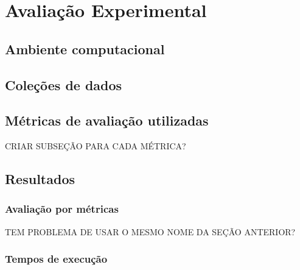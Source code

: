 \chapter{Avaliação Experimental}
\section{Ambiente computacional}



\section{Coleções de dados}



\section{Métricas de avaliação utilizadas}
CRIAR SUBSEÇÃO PARA CADA MÉTRICA?

\section{Resultados}

\subsection{Avaliação por métricas}
TEM PROBLEMA DE USAR O MESMO NOME DA SEÇÃO ANTERIOR?

\subsection{Tempos de execução}

